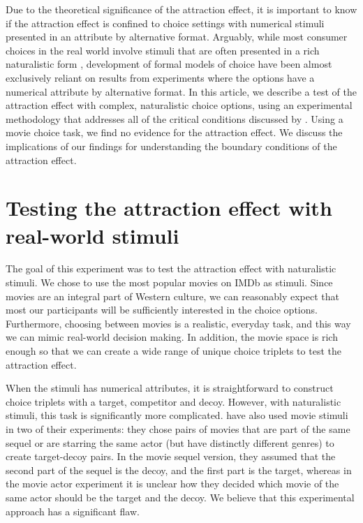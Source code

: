 \documentclass[12pt, a4paper]{article}
\begin{document}
Due to the theoretical significance of the attraction effect, it is important to know if the attraction effect is confined to choice settings with numerical stimuli presented in an attribute by alternative format. Arguably, while most consumer choices in the real world involve stimuli that are often presented in a rich naturalistic form \cite{Bhatia2018b}, development of formal models of choice have been almost exclusively reliant on results from experiments where the options have a numerical attribute by alternative format. In this article, we describe a test of the attraction effect with complex, naturalistic choice options, using an experimental methodology that addresses all of the critical conditions discussed by . Using a movie choice task, we find no evidence for the attraction effect. We discuss the implications of our findings for understanding the boundary conditions of the attraction effect.

\section{Testing the attraction effect with real-world stimuli}

The goal of this experiment was to test the attraction effect with naturalistic stimuli. We chose to use the most popular movies on IMDb as stimuli. Since movies are an integral part of Western culture, we can reasonably expect that most our participants will be sufficiently interested in the choice options. Furthermore, choosing between movies is a realistic, everyday task, and this way we can mimic real-world decision making. In addition, the movie space is rich enough so that we can create a wide range of unique choice triplets to test the attraction effect.

When the stimuli has numerical attributes, it is straightforward to construct choice triplets with a target, competitor and decoy. However, with naturalistic stimuli, this task is significantly more complicated. \citeauthor{Frederick2014} have also used movie stimuli in two of their experiments: they chose pairs of movies that are part of the same sequel or are starring the same actor (but have distinctly different genres) to create target-decoy pairs. In the movie sequel version, they assumed that the second part of the sequel is the decoy, and the first part is the target, whereas in the movie actor experiment it is unclear how they decided which movie of the same actor should be the target and the decoy. We believe that this experimental approach has a significant flaw.
\end{document}
